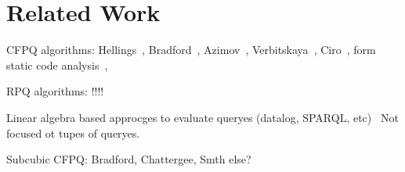 \section{Related Work}

CFPQ algorithms: Hellings~\cite{!!!}, Bradford~\cite{!!!}, Azimov~\cite{!!!}, Verbitskaya~\cite{!!!}, Ciro~\cite{!!!}, form static code analysis~\cite{!!!}, 

RPQ algorithms: !!!!~\cite{!!!}

Linear algebra based approcges to evaluate queryes (datalog, SPARQL, etc)~\cite{!!!} Not focused ot tupes of queryes.

Subcubic CFPQ: Bradford, Chattergee, Smth else?